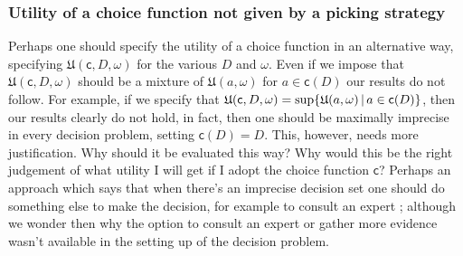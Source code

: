 \documentclass[a4paper]{article}
\renewcommand\c{\mathsf{c}} %
\newcommand\U{\mathfrak{U}} %
\newcommand\SetDelimiter[1][]{
	\nonscript\,#1\vert \allowbreak \nonscript\,\mathopen{}}
\providecommand\given{\SetDelimiter}
\newenvironment{CCM rewritten}
{\begingroup\color{blue}} %
{\endgroup}              %
\begin{document}
%
%
%
%
\subsubsection{Utility of a choice function not given by a picking strategy}

Perhaps one should specify the utility of a choice function in an alternative way, specifying $\U(\c,D,\omega)$ for the various $D$ and $\omega$. 
Even if we impose that $\U(\c,D,\omega)$ should be a mixture of $\U(a,\omega)$ for $a\in\c(D)$ our results do not follow. For example, if we specify that $\U(\c,D,\omega)=\sup\{\U(a,\omega)\given a\in \c(D)\}$, then our results clearly do not hold, in fact, then one should be maximally imprecise in every decision problem, setting $\c(D)=D$. 
This, however, needs more justification. Why should it be evaluated this way?
Why would this be the right judgement of what utility I will get if I adopt the choice function $\c$?
Perhaps an approach which says that when there's an imprecise decision set one should do something else to make the decision, for example to consult an expert \citep{de2014efficient}; although we wonder then why the option to consult an expert or gather more evidence wasn't available in the setting up of the decision problem. 
\end{document}
